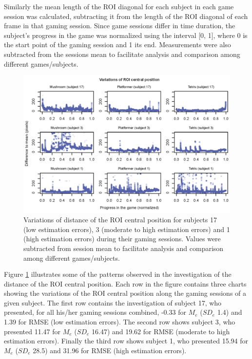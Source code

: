 Similarly the mean length of the ROI diagonal for each subject in each game session was calculated, subtracting it from the length of the ROI diagonal of each frame in that gaming session. Since game sessions differ in time duration, the subject's progress in the game was normalized using the interval [0, 1], where 0 is the start point of the gaming session and 1 its end. Measurements were also subtracted from the sessions mean to facilitate analysis and comparison among different games/subjects.

\begin{figure}[!h]
\centering
\includegraphics[width=\textwidth]{figures/variation-roi-center.png}
\caption{Variations of distance of the ROI central position for subjects 17 (low estimation errors), 3 (moderate to high estimation errors) and 1 (high estimation errors) during their gaming sessions. Values were subtracted from session mean to facilitate analysis and comparison among different games/subjects.}
\label{fig:chart-roi-anomalies-center}
\end{figure}

Figure \ref{fig:chart-roi-anomalies-center} illustrates some of the patterns observed in the investigation of the distance of the ROI central position. Each row in the figure contains three charts showing the variations of the ROI central position along the gaming sessions of a given subject. The first row contains the investigation of subject 17, who presented, for all his/her gaming sessions combined, -0.33 for $M_e$ ($SD_e$ 1.4) and 1.39 for RMSE (low estimation errors). The second row shows subject 3, who presented 11.47 for $M_e$ ($SD_e$ 16.47) and 19.62 for RMSE (moderate to high estimation errors). Finally the third row shows subject 1, who presented 15.94 for $M_e$ ($SD_e$ 28.5) and 31.96 for RMSE (high estimation errors).

